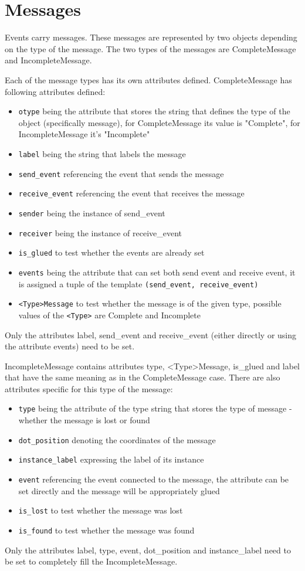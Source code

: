 \documentclass[11pt,oneside]{fithesis2}
\newcommand{\T}[1]{\texttt{#1}}
\newcommand{\ite}[1]{\item{\texttt{#1}}}
\begin{document}
\section{Messages}
Events carry messages. These messages are represented by two objects depending on the type of the message. The two types of the messages are CompleteMessage and IncompleteMessage.

Each of the message types has its own attributes defined. CompleteMessage has following attributes defined:
\begin{itemize}
\ite{otype} being the attribute that stores the string that defines the type of the object (specifically message), for CompleteMessage its value is "Complete", for IncompleteMessage it's "Incomplete"
\ite{label} being the string that labels the message
\ite{send\_event} referencing the event that sends the message
\ite{receive\_event} referencing the event that receives the message
\ite{sender} being the instance of send\_event
\ite{receiver} being the instance of receive\_event
\ite{is\_glued} to test whether the events are already set
\ite{events} being the attribute that can set both send event and receive event, it is assigned a tuple of the template \T{(send\_event, receive\_event)}
\ite{<Type>Message} to test whether the message is of the given type, possible values of the \T{<Type>} are Complete and Incomplete
\end{itemize}

Only the attributes label, send\_event and receive\_event (either directly or using the attribute events) need to be set.

IncompleteMessage contains attributes type, <Type>Message, is\_glued and label that have the same meaning as in the CompleteMessage case. There are also attributes specific for this type of the message:
\begin{itemize}
\ite{type} being the attribute of the type string that stores the type of message - whether the message is lost or found
\ite{dot\_position} denoting the coordinates of the message
\ite{instance\_label} expressing the label of its instance
\ite{event} referencing the event connected to the message, the attribute can be set directly and the message will be appropriately glued
\ite{is\_lost} to test whether the message was lost
\ite{is\_found} to test whether the message was found
\end{itemize}

Only the attributes label, type, event, dot\_position and instance\_label need to be set to completely fill the IncompleteMessage.
\end{document}
